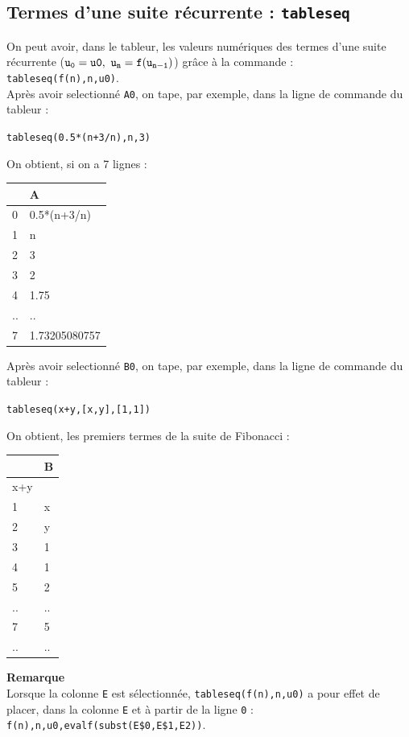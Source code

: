 \documentclass[a4paper,11pt]{book}
\begin{document}
\subsection{Termes d'une suite r\'ecurrente : {\tt tableseq}}\label{sec:tableseq}
On peut avoir, dans le tableur, les valeurs num\'eriques des termes d'une suite
 r\'ecurrente (${\tt u_0=u0, \ u_n=f(u_{n-1})}$) gr\^ace \`a la commande :\\ 
{\tt tableseq(f(n),n,u0)}.\\
Apr\`es avoir selectionn\'e {\tt A0}, on tape, par exemple, dans la ligne de 
commande du tableur :
\begin{center}{\tt tableseq(0.5*(n+3/n),n,3)}\end{center}
On obtient, si on a 7 lignes :
\begin{center}{\tt \begin{tabular}{|l|l|}
\hline
 &A\\
\hline
0 & 0.5*(n+3/n)\\
\hline
1 & n\\
\hline
2 & 3\\
\hline
3 & 2\\
\hline
4 & 1.75\\
\hline
.. &..\\
\hline
7 &1.73205080757\\
\hline
\end{tabular}}\end{center}
Apr\`es avoir selectionn\'e {\tt B0}, on tape, par exemple, dans la ligne de 
commande du tableur :
\begin{center}{\tt tableseq(x+y,[x,y],[1,1])}\end{center}
On obtient, les premiers termes de la suite de Fibonacci :
\begin{center}{\tt \begin{tabular}{|l|l|}
\hline
 &B\\
\hline
x+y & \\
\hline
1 & x\\
\hline
2 & y\\
\hline
3 & 1\\
\hline
4 & 1\\
\hline
5 & 2\\
\hline
.. &..\\
\hline
7 & 5\\
\hline
.. &..\\
\hline
\end{tabular}}\end{center}
{\bf Remarque}\\
 Lorsque la colonne {\tt E} est s\'electionn\'ee, 
{\tt tableseq(f(n),n,u0)} a pour effet de placer,
dans la colonne {\tt E} et \`a partir de la ligne {\tt 0} :\\ 
{\tt f(n),n,u0,evalf(subst(E\$0,E\$1,E2))}.
\end{document}
